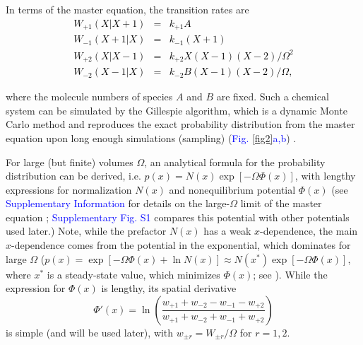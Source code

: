 \documentclass[aps,prl,reprint,singlecolumn,superscriptaddress]{revtex4}
\begin{document}
In terms of the master equation, the transition rates are  \cite{gaspard04,vellela09,endres15}
\textcolor{black}{\begin{subequations}
\begin{eqnarray}
W_{+1}(X|X+1)&=&k_{+1}A\\
W_{-1}(X+1|X)&=&k_{-1}(X+1)\\  
W_{+2}(X|X-1)&=&k_{+2}X(X-1)(X-2)/\Omega^2\\
W_{-2}(X-1|X)&=&k_{-2}B(X-1)(X-2)/\Omega,
\end{eqnarray}
\end{subequations}}
{where the molecule numbers of species $A$ and $B$ are fixed. 
Such a chemical system can be simulated by the Gillespie algorithm, which is a dynamic Monte Carlo method and reproduces the exact 
probability distribution from the master equation upon long enough simulations (sampling)
(\textcolor{blue}{Fig. \ref{fig2}a,b}) \cite{gillespie77}.

For large (but finite) volumes $\Omega$, an analytical formula for the probability distribution can be derived, i.e. 
$p(x)=N(x)\exp[-\Omega\Phi(x)]$, with lengthy expressions for normalization $N(x)$ and nonequilibrium potential $\Phi(x)$  
(see \textcolor{blue}{Supplementary Information} for details on the large-$\Omega$ limit of the master equation \cite{hanggi84}; 
\textcolor{blue}{Supplementary Fig. S1}  compares this potential with other potentials used later.) 
Note, while the prefactor $N(x)$ has a weak $x$-dependence, the main $x$-dependence comes from the
potential in the exponential, which dominates for large $\Omega$ ($p(x)=\exp[-\Omega\Phi(x)+\ln N(x)]\approx N(x^*)\exp[-\Omega\Phi(x)]$, 
where $x^*$ is a steady-state value, which minimizes $\Phi(x)$; see \cite{hanggi84}).
While the expression for $\Phi(x)$ is lengthy, its spatial derivative
\begin{equation}
\Phi'(x)=\ln\left(\frac{w_{+1}+w_{-2}-w_{-1}-w_{+2}}{w_{+1}+w_{-2}+w_{-1}+w_{+2}}\right)\label{phi'}
\end{equation}
is simple (and will be used later), {with $w_{\pm r}=W_{\pm r}/\Omega$ for $r=1,2$.} 

}
\end{document}
